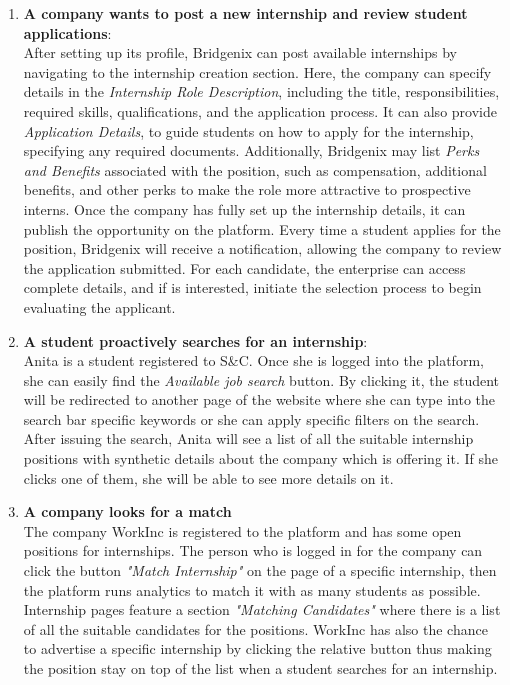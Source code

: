 \begin{enumerate}
\item \textbf{A company wants to post a new internship and review student applications}:
\\After setting up its profile, Bridgenix can post available internships by navigating to the internship creation section. Here, the company can specify details in the \textit{Internship Role Description}, including the title, responsibilities, required skills, qualifications, and the application process.
It can also provide \textit{Application Details}, to guide students on how to apply for the internship, specifying any required documents. Additionally, Bridgenix may list \textit{Perks and Benefits} associated with the position, such as compensation, additional benefits, and other perks to make the role more attractive to prospective interns. Once the company has fully set up the internship details, it can publish the opportunity on the platform. 
Every time a student applies for the position, Bridgenix will receive a notification, allowing the company to review the application submitted. For each candidate, the enterprise can access complete details, and if is interested, initiate the selection process to begin evaluating the applicant.

\item \textbf{A student proactively searches for an internship}:  
\\Anita is a student registered to S\&C. Once she is logged into the platform, she can easily find the \textit{Available job search} button. By clicking it, the student will be redirected to another page of the website where she can type into the search bar specific keywords or she can apply specific filters on the search. After issuing the search, Anita will see a list of all the suitable internship positions with synthetic details about the company which is offering it. If she clicks one of them, she will be able to see more details on it.

\item \textbf{A company looks for a match}   
\\The company WorkInc is registered to the platform and has some open positions for internships. The person who is logged in for the company can click the button \textit{"Match Internship"} on the page of a specific internship, then the platform runs analytics to match it with as many students as possible. Internship pages feature a section \textit{"Matching Candidates"} where there is a list of all the suitable candidates for the positions. WorkInc has also the chance to advertise a specific internship by clicking the relative button thus making the position stay on top of the list when a student searches for an internship.


\end{enumerate}
